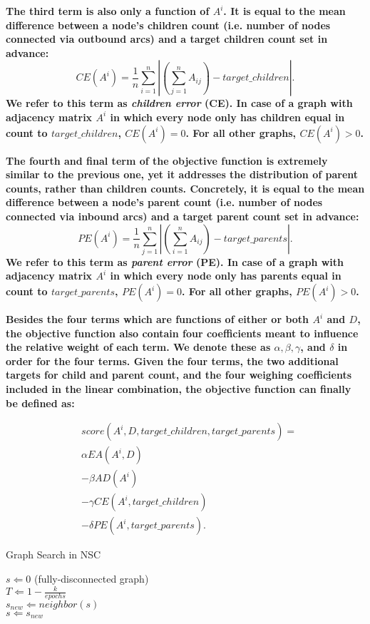 \textbf{The third term is also only a function of $A^i$. It is equal to the mean difference between a node's children count (i.e. number of nodes connected via outbound arcs) and a target children count set in advance: $$CE(A^i) = \frac{1}{n} \sum_{i=1}^{n} \left|(\sum_{j=1}^{n}A_{ij}) - target\_children\right|.$$ We refer to this term as \textit{children error} (CE). In case of a graph with adjacency matrix $A^i$ in which every node only has children equal in count to $target\_children$, $CE(A^i)=0$. For all other graphs, $CE(A^i) > 0$.}

\textbf{The fourth and final term of the objective function is extremely similar to the previous one, yet it addresses the distribution of parent counts, rather than children counts. Concretely, it is equal to the mean difference between a node's parent count (i.e. number of nodes connected via inbound arcs) and a target parent count set in advance: $$PE(A^i) = \frac{1}{n} \sum_{j=1}^{n} \left|(\sum_{i=1}^{n}A_{ij}) - target\_parents\right|.$$ We refer to this term as \textit{parent error} (PE). In case of a graph with adjacency matrix $A^i$ in which every node only has parents equal in count to $target\_parents$, $PE(A^i)=0$. For all other graphs, $PE(A^i) > 0$.}

\textbf{Besides the four terms which are functions of either or both $A^i$ and $D$, the objective function also contain four coefficients meant to influence the relative weight of each term. We denote these as $\alpha, \beta, \gamma$, and $\delta$ in order for the four terms. Given the four terms, the two additional targets for child and parent count, and the four weighing coefficients included in the linear combination, the objective function can finally be defined as:}


\begin{align*}
    & score(A^i, D, target\_children, target\_parents) = \\
    & \alpha EA(A^i, D) \\
    & - \beta AD(A^i) \\
    & - \gamma CE(A^i, target\_children) \\
    & - \delta PE(A^i, target\_parents).
\end{align*}

\begin{algorithm}[!tbp] 
    \caption{Graph Search in NSC}
    \label{alg:gs}
    \begin{algorithmic}
        \STATE $s \Leftarrow 0 $ (fully-disconnected graph) \\
        \STATE $T \Leftarrow 1 - \frac{k}{epochs}$ \\
        \STATE $s_{new} \Leftarrow neighbor(s)$ \\
            \STATE $s \Leftarrow s_{new}$
        \ENDIF
        \ENDFOR
    \end{algorithmic}
\end{algorithm}

